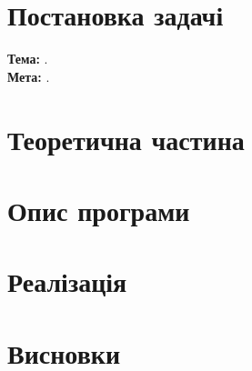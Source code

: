\documentclass[12pt]{report}
\numberwithin{equation}{chapter}
\begin{document}
\graphicspath{{images/}}

\chapter{Постановка задачі}
\textbf{Тема:} \worktheme.\\
\textbf{Мета:} \workobjective.


\chapter{Теоретична частина}

\chapter{Опис програми}

\chapter{Реалізація}

\chapter{Висновки}




\listoffigures
\end{document}
